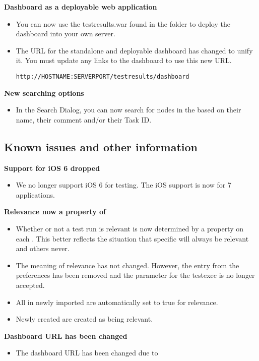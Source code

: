 \textbf{Dashboard as a deployable web application}
\begin{itemize}
\item You can now use the testresults.war found in the  folder to deploy the dashboard into your own server.
\item The URL for the standalone and deployable dashboard has changed to unify it. You must update any links to the dashboard to use this new URL.
\begin{verbatim}
http://HOSTNAME:SERVERPORT/testresults/dashboard
\end{verbatim}

\end{itemize}

\textbf{New searching options}
\begin{itemize}
\item In the Search Dialog, you can now search for nodes in the \gdproject{} based on their name, their comment and/or their Task ID.
\end{itemize}

\subsection{Known issues and other information}
\textbf{Support for iOS 6 dropped}
\begin{itemize}
\item We no longer support iOS 6 for testing. The iOS support is now for 7 applications. 
\end{itemize}

\textbf{Relevance now a property of \gdsuites{}}
\begin{itemize}
\item Whether or not a test run is relevant is now determined by a property on each \gdsuite{}. This better reflects the situation that specific \gdsuites{} will always be relevant and others never. 
\item The meaning of relevance has not changed. However, the entry from the preferences has been removed and the parameter for the testexec is no longer accepted. 
\item All \gdsuites{} in newly imported \gdprojects{} are automatically set to true for relevance.
\item Newly created \gdsuites{} are created as being relevant.
\end{itemize}

\textbf{Dashboard URL has been changed}
\begin{itemize}
\item The dashboard URL has been changed due to 
\end{itemize}
